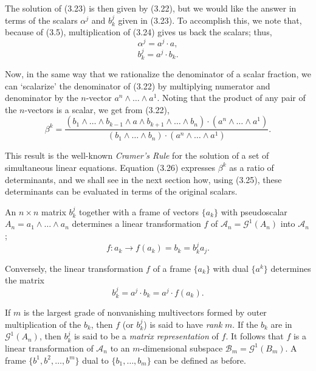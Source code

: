 \documentclass[fleqn]{scrartcl}
\numberwithin{equation}{section}
\begin{document}
\noindent The solution of (3.23) is then given by (3.22), but we would like the answer in terms of the scalars \(\alpha^j\) and \(b_k^j\) given in (3.23). To accomplish this, we note that, because of (3.5), multiplication of (3.24) gives us back the scalars; thus,
\begin{equation}
\alpha^j = a^j \cdot a, \tag{3.25a}
\end{equation}
\begin{equation}
b_k^j = a^j \cdot b_k. \tag{3.25b}
\end{equation}

\vspace{1em}
\noindent Now, in the same way that we rationalize the denominator of a scalar fraction, we can `scalarize' the denominator of (3.22) by multiplying numerator and denominator by the \(n\)-vector \(a^n \wedge \dots \wedge a^1\). Noting that the product of any pair of the \(n\)-vectors is a scalar, we get from (3.22),
\begin{equation}
\beta^k = \frac{(b_1 \wedge \dots \wedge b_{k-1} \wedge a \wedge b_{k+1} \wedge \dots \wedge b_n) \cdot (a^n \wedge \dots \wedge a^1)}{(b_1 \wedge \dots \wedge b_n) \cdot (a^n \wedge \dots \wedge a^1)}. \tag{3.26}
\end{equation}

\noindent This result is the well-known \textit{Cramer's Rule} for the solution of a set of simultaneous linear equations. Equation (3.26) expresses \(\beta^k\) as a ratio of determinants, and we shall see in the next section how, using (3.25), these determinants can be evaluated in terms of the original scalars.

\vspace{1em}
\noindent An \(n \times n\) matrix \(b_k^j\) together with a frame of vectors \(\{a_k\}\) with pseudoscalar \(A_n = a_1 \wedge \dots \wedge a_n\) determines a linear transformation \(f\) of \(\mathscr{A}_n = \mathscr{G}^1(A_n)\) into \(\mathscr{A}_n\);
\begin{equation}
f \colon a_k \to f(a_k) = b_k = b_k^j a_j. \tag{3.27a}
\end{equation}

\noindent Conversely, the linear transformation \(f\) of a frame \(\{a_k\}\) with dual \(\{a^k\}\) determines the matrix
\begin{equation}
b_k^j = a^j \cdot b_k = a^j \cdot f(a_k). \tag{3.27b}
\end{equation}

\vspace{1em}
\noindent If \(m\) is the largest grade of nonvanishing multivectors formed by outer multiplication of the \(b_k\), then \(f\) (or \(b_k^j\)) is said to have \textit{rank} \(m\). If the \(b_k\) are in \(\mathscr{G}^1(A_n)\), then \(b_k^j\) is said to be a \textit{matrix representation} of \(f\). It follows that \(f\) is a linear transformation of \(\mathscr{A}_n\) to an \(m\)-dimensional subspace \(\mathscr{B}_m = \mathscr{G}^1(B_m)\). A frame \(\{b^1, b^2, \dots, b^m\}\) dual to \(\{b_1, \dots, b_m\}\) can be defined as before.
\end{document}
